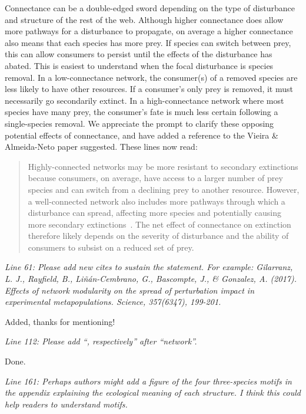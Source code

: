 \documentclass[12pt]{article}
\newcommand{\us}{\rm \setlength{\leftskip}{0.3cm} \setlength{\rightskip}{0.3cm}}
\newcommand{\them}{\it \setlength{\leftskip}{0cm} \setlength{\rightskip}{0cm}}
\begin{document}
        \us Connectance can be a double-edged sword depending on the type of disturbance and structure of the rest of the web. Although higher connectance does allow more pathways for a disturbance to propagate, on average a higher connectance also means that each species has more prey. If species can switch between prey, this can allow consumers to persist until the effects of the disturbance has abated. This is easiest to understand when the focal disturbance is species removal. In a low-connectance network, the consumer(s) of a removed species are less likely to have other resources. If a consumer's only prey is removed, it must necessarily go secondarily extinct. In a high-connectance network where most species have many prey, the consumer's fate is much less certain following a single-species removal. We appreciate the prompt to clarify these opposing potential effects of connectance, and have added a reference to the Vieira \& Almeida-Neto paper suggested. These lines now read:
        
            \begin{quotation}
                 Highly-connected networks may be more resistant to secondary extinctions \citep{Dunne2002, Eklof2006} because consumers, on average, have access to a larger number of prey species and can switch from a declining prey to another resource. However, a well-connected network also includes more pathways through which a disturbance can spread, affecting more species and potentially causing more secondary extinctions~\citep{Vieira2015}.
                    The net effect of connectance on extinction therefore likely depends on the severity of disturbance and the ability of consumers to subsist on a reduced set of prey.    
            \end{quotation}
        
        
        \them
        Line 61: Please add new cites to sustain the statement. For example:
        Gilarranz, L. J., Rayfield, B., Liñán-Cembrano, G., Bascompte, J., \& Gonzalez, A. (2017). Effects of network modularity on the spread of perturbation impact in experimental metapopulations. Science, 357(6347), 199-201.
        
        \us
        Added, thanks for mentioning!
        
        \them
        Line 112: Please add ``, respectively'' after ``network''.
        
        \us
        Done.
        
        \them
        Line 161: Perhaps authors might add a figure of the four three-species motifs in the appendix explaining the ecological meaning of each structure. I think this could help readers to understand motifs.
        
\end{document}
